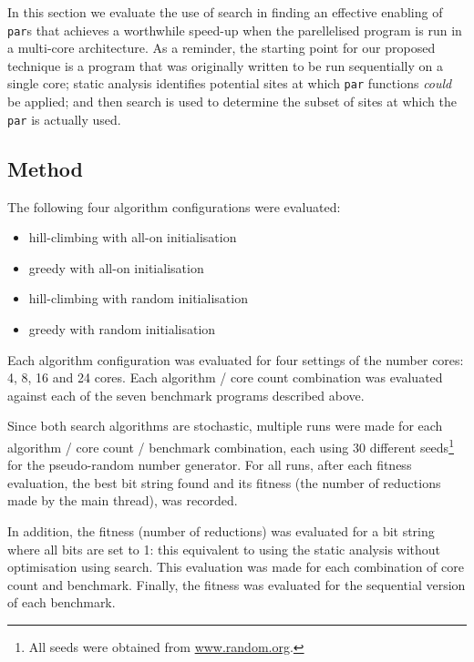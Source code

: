 In this section we evaluate the use of search in finding an effective enabling
of \verb-par-s that achieves a worthwhile speed-up when the parellelised
program is run in a multi-core architecture.  As a reminder, the starting point
for our proposed technique is a program that was originally written to be run
sequentially on a single core; static analysis identifies potential sites at
which \verb-par- functions \emph{could} be applied; and then search is used to
determine the subset of sites at which the \verb-par- is actually used.


\subsection{Method}

The following four algorithm configurations were evaluated:
\begin{itemize}
	\item hill-climbing with all-on initialisation
	\item greedy with all-on initialisation
	\item hill-climbing with random initialisation
	\item greedy with random initialisation
\end{itemize}

Each algorithm configuration was evaluated for four settings of the number
cores: 4, 8, 16 and 24 cores. Each algorithm / core count combination was
evaluated against each of the seven benchmark programs described above.

Since both search algorithms are stochastic, multiple runs were made for each
algorithm / core count / benchmark combination, each using 30 different
seeds\footnote{All seeds were obtained from \url{www.random.org}.} for the
pseudo-random number generator.  For all runs, after each fitness evaluation,
the best bit string found and its fitness (the number of reductions made by the
main thread), was recorded.

In addition, the fitness (number of reductions) was evaluated for a bit string
where all bits are set to 1: this equivalent to using the static analysis
without optimisation using search.  This evaluation was made for each
combination of core count and benchmark.  Finally, the fitness was evaluated for the
sequential version of each benchmark.

